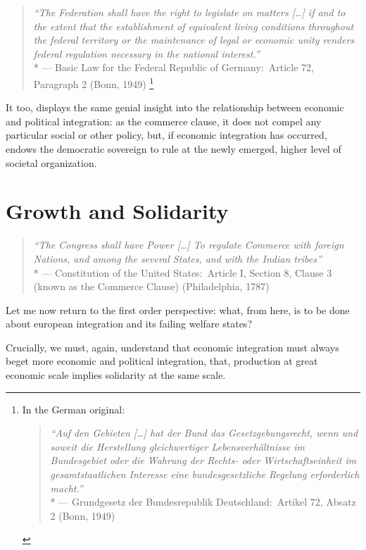 \begin{quote}
	\emph{``The Federation shall have the right to legislate on matters [\ldots] if and to the extent that the establishment of equivalent living conditions throughout the federal territory or the maintenance of legal or economic unity renders federal regulation necessary in the national interest.''}
	\\*
	--- Basic Law for the Federal Republic of Germany:\ Article 72, Paragraph 2 (Bonn, 1949)
	\footnote{
		In the German original:
		\begin{quote}
		\emph{``Auf den Gebieten [\ldots] hat der Bund das Gesetzgebungsrecht, wenn und soweit die Herstellung gleichwertiger Lebensverhältnisse im Bundesgebiet oder die Wahrung der Rechts- oder Wirtschaftseinheit im gesamtstaatlichen Interesse eine bundesgesetzliche Regelung erforderlich macht.''}
		\\*
		--- Grundgesetz der Bundesrepublik Deutschland:\ Artikel 72, Absatz 2 (Bonn, 1949)
		\end{quote}
	}
\end{quote}

It too, displays the same genial insight into the relationship between economic and political integration:
as the commerce clause, it does not compel any particular social or other policy, but, if economic integration has occurred, endows the democratic sovereign to rule at the newly emerged, higher level of societal organization.


\section{Growth and Solidarity} \label{sec:growth-solidarity}

\begin{quote}
	\emph{``The Congress shall have Power [\ldots] To regulate Commerce with foreign Nations, and among the several States, and with the Indian tribes''}
	\\*
	--- Constitution of the United States:\ Article I, Section 8, Clause 3 (known as the Commerce Clause) (Philadelphia, 1787)
\end{quote}

Let me now return to the first order perspective:
what, from here, is to be done about european integration and its failing welfare states?

Crucially, we must, again, understand that economic integration must always beget more economic and political integration, that, production at great economic scale implies solidarity at the same scale.

